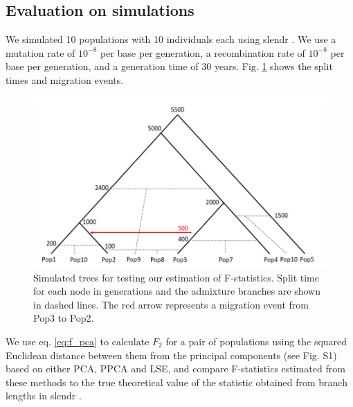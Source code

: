 \documentclass[12pt, letterpaper]{article}
\begin{document}
\subsection{Evaluation on simulations}
We simulated 10 populations with 10 individuals each using slendr \cite{petr_slendr_2022}. We use a mutation rate of $10^{-8}$ per base per generation, a recombination rate of $10^{-8}$ per base per generation, and a generation time of 30 years. Fig. \ref{fig2:sim} shows the split times and migration events. 

\begin{figure}[ht!]
    \includegraphics[width=16.5cm]{inkscape/sim1.png}
    \centering
    \caption{Simulated trees for testing our estimation of F-statistics. Split time for each node in generations and the admixture branches are shown in dashed lines. The red arrow represents a migration event from Pop3 to Pop2.}
    \label{fig2:sim}
\end{figure}

We use eq. \ref{eq:f_pca} to calculate $F_2$ for a pair of populations using the  squared Euclidean distance between them from the principal components (see Fig. S1) based on either  PCA, PPCA and LSE, and compare F-statistics estimated from these methods to the true theoretical value of the statistic obtained from branch lengths in slendr \cite{petr_slendr_2022}. 
\end{document}

